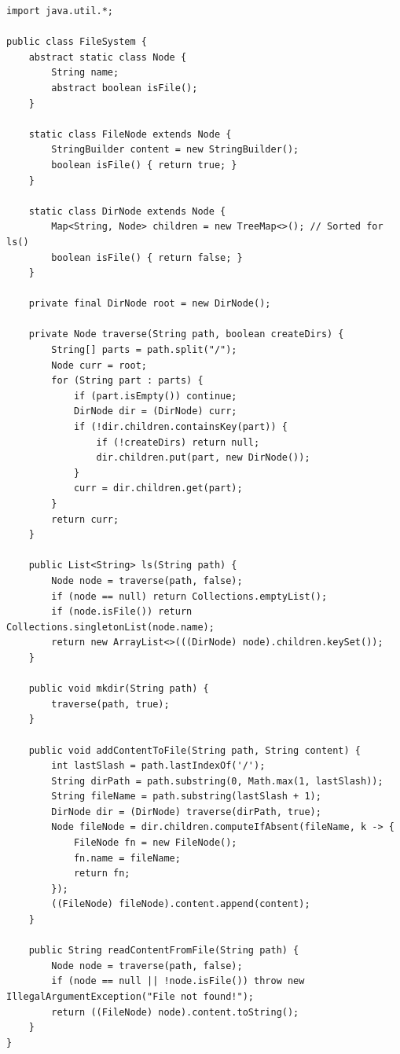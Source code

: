 \documentclass[10pt,journal,compsoc,onecolumn]{IEEEtran}
\begin{document}
\begin{verbatim}
import java.util.*;

public class FileSystem {
    abstract static class Node {
        String name;
        abstract boolean isFile();
    }

    static class FileNode extends Node {
        StringBuilder content = new StringBuilder();
        boolean isFile() { return true; }
    }

    static class DirNode extends Node {
        Map<String, Node> children = new TreeMap<>(); // Sorted for ls()
        boolean isFile() { return false; }
    }

    private final DirNode root = new DirNode();

    private Node traverse(String path, boolean createDirs) {
        String[] parts = path.split("/");
        Node curr = root;
        for (String part : parts) {
            if (part.isEmpty()) continue;
            DirNode dir = (DirNode) curr;
            if (!dir.children.containsKey(part)) {
                if (!createDirs) return null;
                dir.children.put(part, new DirNode());
            }
            curr = dir.children.get(part);
        }
        return curr;
    }

    public List<String> ls(String path) {
        Node node = traverse(path, false);
        if (node == null) return Collections.emptyList();
        if (node.isFile()) return Collections.singletonList(node.name);
        return new ArrayList<>(((DirNode) node).children.keySet());
    }

    public void mkdir(String path) {
        traverse(path, true);
    }

    public void addContentToFile(String path, String content) {
        int lastSlash = path.lastIndexOf('/');
        String dirPath = path.substring(0, Math.max(1, lastSlash));
        String fileName = path.substring(lastSlash + 1);
        DirNode dir = (DirNode) traverse(dirPath, true);
        Node fileNode = dir.children.computeIfAbsent(fileName, k -> {
            FileNode fn = new FileNode();
            fn.name = fileName;
            return fn;
        });
        ((FileNode) fileNode).content.append(content);
    }

    public String readContentFromFile(String path) {
        Node node = traverse(path, false);
        if (node == null || !node.isFile()) throw new IllegalArgumentException("File not found!");
        return ((FileNode) node).content.toString();
    }
}
\end{verbatim}
\end{document}
